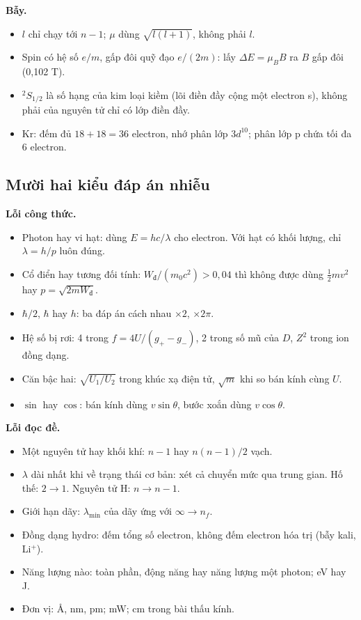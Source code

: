 \documentclass[11pt,a4paper]{article}
\newcommand{\Wd}{W_{\text{đ}}}
\begin{document}
\textbf{Bẫy.}
\begin{itemize}
    \item $l$ chỉ chạy tới $n-1$; $\mu$ dùng $\sqrt{l(l+1)}$, không phải $l$.
    \item Spin có hệ số $e/m$, gấp đôi quỹ đạo $e/(2m)$: lấy $\Delta E=\mu_BB$ ra $B$ gấp đôi (0,102 T).
    \item ${}^2S_{1/2}$ là số hạng của kim loại kiềm (lõi điền đầy cộng một electron s), không phải của nguyên tử chỉ có lớp điền đầy.
    \item Kr: đếm đủ $18+18=36$ electron, nhớ phân lớp $3d^{10}$; phân lớp p chứa tối đa 6 electron.
\end{itemize}

\subsection*{Mười hai kiểu đáp án nhiễu}

\textbf{Lỗi công thức.}
\begin{itemize}
    \item Photon hay vi hạt: dùng $E=hc/\lambda$ cho electron. Với hạt có khối lượng, chỉ $\lambda=h/p$ luôn đúng.
    \item Cổ điển hay tương đối tính: $\Wd/(m_0c^2)>0{,}04$ thì không được dùng $\frac12mv^2$ hay $p=\sqrt{2m\Wd}$.
    \item $\hbar/2$, $\hbar$ hay $h$: ba đáp án cách nhau $\times2$, $\times2\pi$.
    \item Hệ số bị rơi: 4 trong $f=4U/(g_+-g_-)$, 2 trong số mũ của $D$, $Z^2$ trong ion đồng dạng.
    \item Căn bậc hai: $\sqrt{U_1/U_2}$ trong khúc xạ điện tử, $\sqrt m$ khi so bán kính cùng $U$.
    \item $\sin$ hay $\cos$: bán kính dùng $v\sin\theta$, bước xoắn dùng $v\cos\theta$.
\end{itemize}
\textbf{Lỗi đọc đề.}
\begin{itemize}
    \item Một nguyên tử hay khối khí: $n-1$ hay $n(n-1)/2$ vạch.
    \item $\lambda$ dài nhất khi về trạng thái cơ bản: xét cả chuyển mức qua trung gian. Hố thế: $2\to1$. Nguyên tử H: $n\to n-1$.
    \item Giới hạn dãy: $\lambda_{\min}$ của dãy ứng với $\infty\to n_f$.
    \item Đồng dạng hydro: đếm tổng số electron, không đếm electron hóa trị (bẫy kali, Li$^{+}$).
    \item Năng lượng nào: toàn phần, động năng hay năng lượng một photon; eV hay J.
    \item Đơn vị: Å, nm, pm; mW; cm trong bài thấu kính.
\end{itemize}
\end{document}
